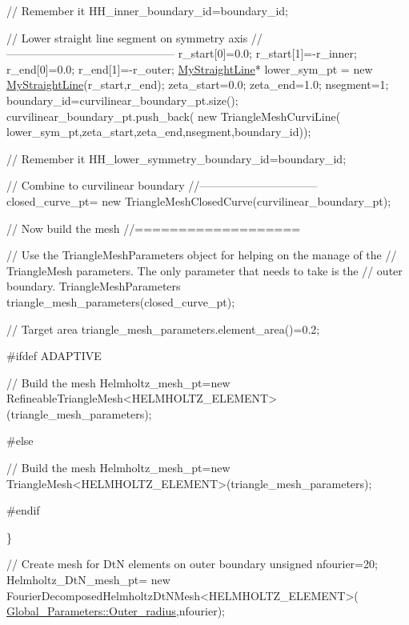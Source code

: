 \begin{DoxyCodeInclude}
  \textcolor{comment}{// Remember it}
  HH\_inner\_boundary\_id=boundary\_id;
  
  \textcolor{comment}{// Lower straight line segment on symmetry axis}
  \textcolor{comment}{//---------------------------------------------}
  r\_start[0]=0.0;
  r\_start[1]=-r\_inner;
  r\_end[0]=0.0;
  r\_end[1]=-r\_outer;
  \hyperlink{classMyStraightLine}{MyStraightLine}* lower\_sym\_pt = \textcolor{keyword}{new} \hyperlink{classMyStraightLine}{MyStraightLine}(r\_start,r\_end);
  zeta\_start=0.0;
  zeta\_end=1.0;
  nsegment=1;
  boundary\_id=curvilinear\_boundary\_pt.size();
  curvilinear\_boundary\_pt.push\_back(
   \textcolor{keyword}{new} TriangleMeshCurviLine(
    lower\_sym\_pt,zeta\_start,zeta\_end,nsegment,boundary\_id));
      
  \textcolor{comment}{// Remember it}
  HH\_lower\_symmetry\_boundary\_id=boundary\_id;

  \textcolor{comment}{// Combine to curvilinear boundary}
  \textcolor{comment}{//--------------------------------}
  closed\_curve\_pt=
   \textcolor{keyword}{new} TriangleMeshClosedCurve(curvilinear\_boundary\_pt); 
  
  \textcolor{comment}{// Now build the mesh}
  \textcolor{comment}{//===================}

  \textcolor{comment}{// Use the TriangleMeshParameters object for helping on the manage of the}
  \textcolor{comment}{// TriangleMesh parameters. The only parameter that needs to take is the}
  \textcolor{comment}{// outer boundary.}
  TriangleMeshParameters triangle\_mesh\_parameters(closed\_curve\_pt);

  \textcolor{comment}{// Target area}
  triangle\_mesh\_parameters.element\_area()=0.2;
 
\textcolor{preprocessor}{#ifdef ADAPTIVE}

  \textcolor{comment}{// Build the mesh}
  Helmholtz\_mesh\_pt=\textcolor{keyword}{new} 
   RefineableTriangleMesh<HELMHOLTZ\_ELEMENT>(triangle\_mesh\_parameters);

\textcolor{preprocessor}{#else}

  \textcolor{comment}{// Build the mesh}
  Helmholtz\_mesh\_pt=\textcolor{keyword}{new} 
   TriangleMesh<HELMHOLTZ\_ELEMENT>(triangle\_mesh\_parameters);

\textcolor{preprocessor}{#endif}

 \}

 \textcolor{comment}{// Create mesh for DtN elements on outer boundary}
 \textcolor{keywordtype}{unsigned} nfourier=20;
 Helmholtz\_DtN\_mesh\_pt=
  \textcolor{keyword}{new} FourierDecomposedHelmholtzDtNMesh<HELMHOLTZ\_ELEMENT>(
   \hyperlink{namespaceGlobal__Parameters_a88ded445ecd7bd89701409e68fd0b900}{Global\_Parameters::Outer\_radius},nfourier);



\end{DoxyCodeInclude}
